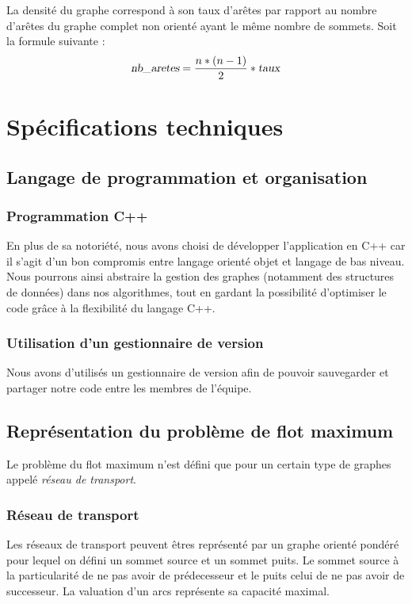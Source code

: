 La densité du graphe correspond à son taux d'arêtes par rapport au nombre d'arêtes du graphe complet non orienté ayant le même nombre de sommets. Soit la formule suivante :
\[ \textsl{nb\_aretes} = \frac{n*(n-1)}{2}*\textsl{taux}\]

\section{Spécifications techniques}

\subsection{Langage de programmation et organisation}

\subsubsection{Programmation C++}
En plus de sa notoriété, nous avons choisi de développer l'application en C++ car il s'agit d'un bon compromis entre langage orienté objet et langage de bas niveau. Nous pourrons ainsi abstraire la gestion des graphes (notamment des structures de données) dans nos algorithmes, tout en gardant la possibilité d'optimiser le code grâce à la flexibilité du langage C++.

\subsubsection{Utilisation d'un gestionnaire de version}
Nous avons d'utilisés un gestionnaire de version afin de pouvoir sauvegarder et partager notre code entre les membres
de l'équipe.	

\subsection{Représentation du problème de flot maximum}

Le problème du flot maximum n'est défini que pour un certain type de graphes appelé \emph{réseau de transport}.

\subsubsection{Réseau de transport}
Les réseaux de transport peuvent êtres représenté par un graphe orienté pondéré pour lequel on défini un sommet
source et un sommet puits. Le sommet source à la particularité de ne pas avoir de prédecesseur et le puits celui
de ne pas avoir de successeur. La valuation d'un arcs représente sa capacité maximal.

